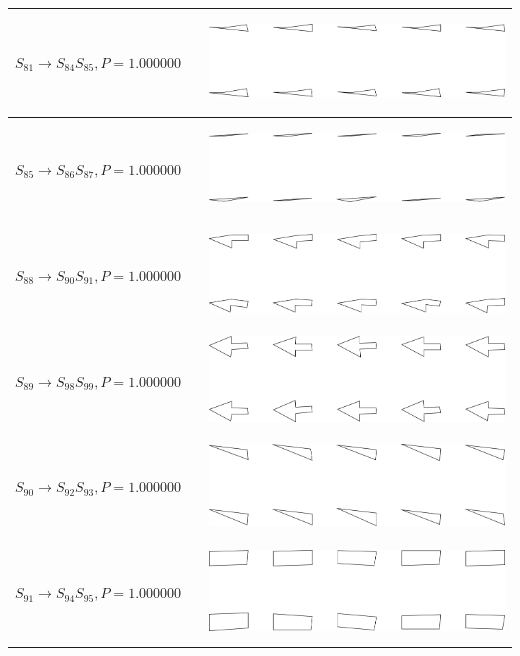 \begin{tabular}{|l|c|c|}

\hline
$S_{81} \to S_{84} S_{85}, P=1.000000$ &  & \includegraphics[height=1in]{output/1.models/hand_built/romerchoice/gram.0042.sample.png} \\
\hline
$S_{85} \to S_{86} S_{87}, P=1.000000$ &  & \includegraphics[height=1in]{output/1.models/hand_built/romerchoice/gram.0043.sample.png} \\
\hline
$S_{88} \to S_{90} S_{91}, P=1.000000$ &  & \includegraphics[height=1in]{output/1.models/hand_built/romerchoice/gram.0044.sample.png} \\
\hline
$S_{89} \to S_{98} S_{99}, P=1.000000$ &  & \includegraphics[height=1in]{output/1.models/hand_built/romerchoice/gram.0045.sample.png} \\
\hline
$S_{90} \to S_{92} S_{93}, P=1.000000$ &  & \includegraphics[height=1in]{output/1.models/hand_built/romerchoice/gram.0046.sample.png} \\
\hline
$S_{91} \to S_{94} S_{95}, P=1.000000$ &  & \includegraphics[height=1in]{output/1.models/hand_built/romerchoice/gram.0047.sample.png} \\
\hline
\end{tabular}

